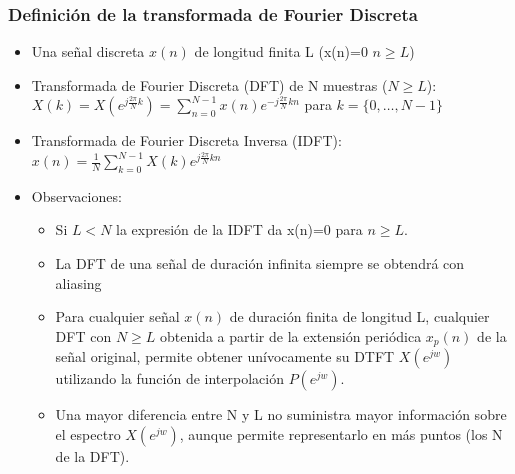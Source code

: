 \begin{frame}
  \frametitle{Definición de la transformada de Fourier Discreta}

  \footnotesize
  \begin{itemize}
    \item Una señal discreta $x(n)$ de longitud finita L  (x(n)=0 $n\ge L$)
    \item Transformada de Fourier Discreta (DFT) de N muestras ($N \ge L$):
    \hspace{0.5cm} \alert{$X(k)=X(e^{j\frac{2\pi}{N}k})=\sum_{n=0}^{N-1} x(n) e^{-j\frac{2\pi}{N}kn}$}   para $k=\{0,\dots,N-1\}$
    \item Transformada de Fourier Discreta Inversa (IDFT):
    \hspace{0.5cm} \alert{$x(n)=\frac{1}{N}\sum_{k=0}^{N-1} X(k) e^{j\frac{2\pi}{N}kn}$}

    \item Observaciones:
    \begin{itemize}
    \footnotesize
      \item Si $L < N$ la expresión de la IDFT da x(n)=0 para $n\ge L$.
      \item La DFT de una señal de duración infinita siempre se obtendrá con aliasing
      \item Para cualquier señal $x(n)$ de duración finita de longitud L, cualquier DFT con $N\ge L$ obtenida a partir de la extensión periódica $x_p(n)$ de la señal original, permite obtener unívocamente su DTFT $X(e^{jw})$ utilizando la función de interpolación $P(e^{jw})$.
      \item Una mayor diferencia entre N y L no suministra mayor información sobre el espectro $X(e^{jw})$, aunque permite representarlo en más puntos (los N de la DFT).
    \end{itemize}
  \end{itemize}
\end{frame}